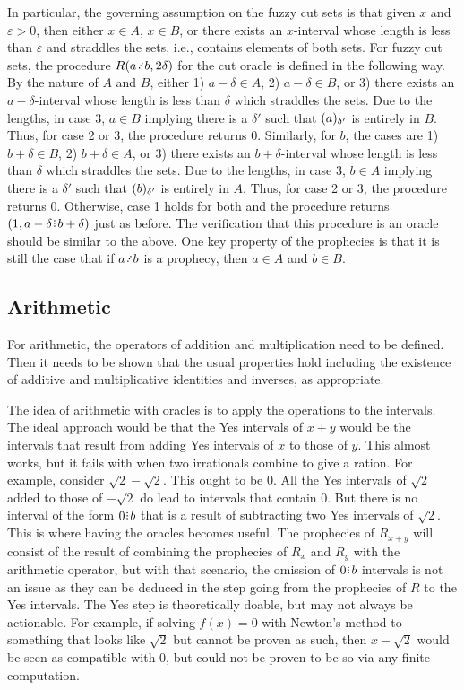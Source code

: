 \documentclass[12pt]{article}
\begin{document}
In particular, the governing assumption on the fuzzy cut sets is that given $x$ and $\varepsilon >0$, then either $x \in A$, $x \in B$, or there exists an $x$-interval whose length is less than $\varepsilon$ and straddles the sets, i.e., contains elements of both sets.  For fuzzy cut sets, the procedure $R(a \lte b, 2\delta)$ for the cut oracle is defined in the following way. By the nature of $A$ and $B$, either 1) $a - \delta \in A$, 2) $a - \delta \in B$, or 3) there exists an $a-\delta$-interval whose length is less than $\delta$ which straddles the sets. Due to the lengths, in case 3, $a \in B$ implying there is a $\delta'$ such that $\halo[\delta']{a}$ is entirely in $B$.  Thus, for case 2 or 3, the procedure returns $0$. Similarly, for $b$, the cases are 1) $b + \delta \in B$, 2) $b+\delta \in A$, or 3) there exists an $b+\delta$-interval whose length is less than $\delta$ which straddles the sets. Due to the lengths, in case 3, $b \in A$ implying there is a $\delta'$ such that $\halo[\delta']{b}$ is entirely in $A$.  Thus, for case 2 or 3, the procedure returns $0$. Otherwise, case 1 holds for both and the procedure returns $(1, a-\delta\rint b+\delta)$ just as before. The verification that this procedure is an oracle should be similar to the above. One key property of the prophecies is that it is still the case that if $a \lte b$ is a prophecy, then $a \in A$ and $b \in B$.


\subsection{Arithmetic}

For arithmetic, the operators of addition and multiplication need to be defined. Then it needs to be shown that the usual properties hold including the existence of additive and multiplicative identities and inverses, as appropriate. 

The idea of arithmetic with oracles is to apply the operations to the intervals. The ideal approach would be that the Yes intervals of $x+y$ would be the intervals that result from adding Yes intervals of $x$ to those of $y$. This almost works, but it fails with when two irrationals combine to give a ration. For example, consider $\sqrt{2} - \sqrt{2}$. This ought to be $0$. All the Yes intervals of $\sqrt{2}$ added to those of $-\sqrt{2}$ do lead to intervals that contain $0$. But there is no interval of the form $0\rint b$ that is a result of subtracting two Yes intervals of $\sqrt{2}$. This is where having the oracles becomes useful. The prophecies of $R_{x+y}$ will consist of the result of combining the prophecies of $R_x$ and $R_y$ with the arithmetic operator, but with that scenario, the omission of $0\rint b$ intervals is not an issue as they can be deduced in the step going from the prophecies of $R$ to the Yes intervals. The Yes step is theoretically doable, but may not always be actionable. For example, if solving $f(x)=0$ with Newton's method to something that looks like $\sqrt{2}$ but cannot be proven as such, then $x - \sqrt{2}$ would be seen as compatible with $0$, but could not be proven to be so via any finite computation. 
\end{document}
